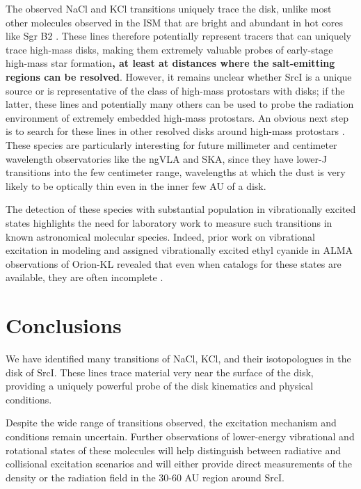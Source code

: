\documentclass[twocolumn]{aastex62}
\newcommand{\sourcei}{SrcI\xspace}
\newcommand{\referee}[1]{\textbf{#1}}
\begin{document}
The observed NaCl and KCl transitions uniquely trace the disk, unlike most other
molecules observed in the ISM that are bright and abundant in hot cores like
Sgr B2 \citep{Nummelin1998a,Belloche2013a}.  These lines therefore potentially
represent tracers that can uniquely trace high-mass disks, making them extremely
valuable probes of early-stage high-mass star formation\referee{, at least at
distances where the salt-emitting regions can be resolved}.
However, it remains unclear whether \sourcei is a unique source or is
representative of the class of high-mass protostars with disks; if the latter,
these lines and potentially many others can be used to probe the radiation
environment of extremely embedded high-mass protostars.  An obvious next step
is to search for these lines in other resolved disks around high-mass
protostars \citep[e.g.,  HH80/81;][]{Girart2017a}.  These species are
particularly interesting for future millimeter and centimeter wavelength
observatories like the ngVLA and SKA, since they have lower-J transitions into
the few centimeter range, wavelengths at which the dust is very likely
to be optically thin even in the inner few AU of a disk.

The detection of these species with substantial population in vibrationally
excited states highlights the need for laboratory work to measure such
transitions in known astronomical molecular species. Indeed, prior work on
vibrational excitation in modeling and assigned vibrationally excited ethyl
cyanide in ALMA observations of Orion-KL revealed that even when catalogs for
these states are available, they are often incomplete \citep{Fortman2012a}.









\section{Conclusions}
We have identified many transitions of NaCl, KCl, and their isotopologues in
the disk of \sourcei.  These lines trace material very near the surface of the
disk, providing a uniquely powerful probe of the disk kinematics and physical
conditions.

Despite the wide range of transitions observed, the excitation mechanism and
conditions remain uncertain.  Further observations of lower-energy vibrational
and rotational states of these molecules will help distinguish between
radiative and collisional excitation scenarios and will either provide
direct measurements of the density or the radiation field in the 30-60 AU
region around \sourcei.
\end{document}
